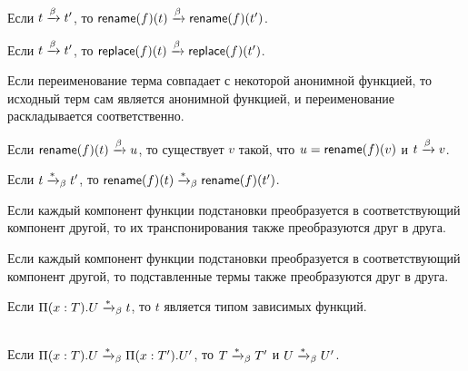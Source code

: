 \begin{lemma}
Если $t \xrightarrow{\beta} t'$, то
$\mathsf{rename}(f)(t) \xrightarrow{\beta} \mathsf{rename}(f)(t')$.
\end{lemma}

\begin{lemma}
Если $t \xrightarrow{\beta} t'$, то
$\mathsf{replace}(f)(t) \xrightarrow{\beta} \mathsf{replace}(f)(t')$.
\end{lemma}

\begin{lemma}
Если переименование терма совпадает с некоторой
анонимной функцией, то исходный терм сам
является анонимной функцией, и переименование
раскладывается соответственно.
\end{lemma}

\begin{lemma}
Если $\mathsf{rename}(f)(t) \xrightarrow{\beta} u$, то существует $v$ такой,
что $u = \mathsf{rename}(f)(v)$ и $t \xrightarrow{\beta} v$.
\end{lemma}

\begin{lemma}
Если $t \xrightarrow{*}_{\beta} t'$, то
$\mathsf{rename}(f)(t) \xrightarrow{*}_{\beta} \mathsf{rename}(f)(t')$.
\end{lemma}

\begin{lemma}
Если каждый компонент функции подстановки преобразуется
в соответствующий компонент другой, то их
транспонирования также преобразуются друг в друга.
\end{lemma}

\begin{lemma}
Если каждый компонент функции подстановки преобразуется
в соответствующий компонент другой, то подставленные
термы также преобразуются друг в друга.
\end{lemma}

\begin{lemma}
Если $\Pi(x:T).U \xrightarrow{*}_{\beta} t$, то $t$ является типом
зависимых функций.
\end{lemma}

\begin{lemma}
\.\\ Если $\Pi(x:T).U \xrightarrow{*}_{\beta} \Pi(x:T').U'$, то
$T \xrightarrow{*}_{\beta} T'$ и $U \xrightarrow{*}_{\beta} U'$.
\end{lemma}

